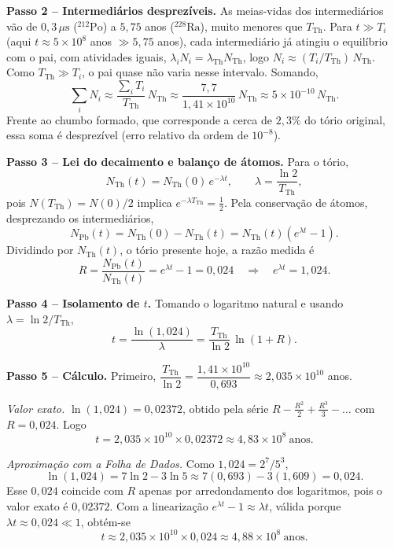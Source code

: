 \documentclass{article}%
\begin{document}
\textbf{Passo 2 -- Intermediários desprezíveis.} As meias-vidas dos intermediários vão de $0{,}3\,\mu\mathrm{s}$ (${}^{212}\mathrm{Po}$) a $5{,}75$ anos (${}^{228}\mathrm{Ra}$), muito menores que $T_{\mathrm{Th}}$. Para $t\gg T_i$ (aqui $t\approx5\times10^{8}$ anos $\gg5{,}75$ anos), cada intermediário já atingiu o equilíbrio com o pai, com atividades iguais, $\lambda_iN_i=\lambda_{\mathrm{Th}}N_{\mathrm{Th}}$, logo $N_i\approx(T_i/T_{\mathrm{Th}})\,N_{\mathrm{Th}}$. Como $T_{\mathrm{Th}}\gg T_i$, o pai quase não varia nesse intervalo. Somando,
\[
\sum_i N_i\approx\frac{\sum_i T_i}{T_{\mathrm{Th}}}\,N_{\mathrm{Th}}\approx\frac{7{,}7}{1{,}41\times10^{10}}\,N_{\mathrm{Th}}\approx5\times10^{-10}\,N_{\mathrm{Th}}.
\]
Frente ao chumbo formado, que corresponde a cerca de $2{,}3\%$ do tório original, essa soma é desprezível (erro relativo da ordem de $10^{-8}$).

\textbf{Passo 3 -- Lei do decaimento e balanço de átomos.} Para o tório,
\[
N_{\mathrm{Th}}(t)=N_{\mathrm{Th}}(0)\,e^{-\lambda t},\qquad \lambda=\frac{\ln 2}{T_{\mathrm{Th}}},
\]
pois $N(T_{\mathrm{Th}})=N(0)/2$ implica $e^{-\lambda T_{\mathrm{Th}}}=\tfrac12$. Pela conservação de átomos, desprezando os intermediários,
\[
N_{\mathrm{Pb}}(t)=N_{\mathrm{Th}}(0)-N_{\mathrm{Th}}(t)=N_{\mathrm{Th}}(t)\left(e^{\lambda t}-1\right).
\]
Dividindo por $N_{\mathrm{Th}}(t)$, o tório presente hoje, a razão medida é
\[
R=\frac{N_{\mathrm{Pb}}(t)}{N_{\mathrm{Th}}(t)}=e^{\lambda t}-1=0{,}024\quad\Longrightarrow\quad e^{\lambda t}=1{,}024.
\]

\textbf{Passo 4 -- Isolamento de $t$.} Tomando o logaritmo natural e usando $\lambda=\ln 2/T_{\mathrm{Th}}$,
\[
t=\frac{\ln(1{,}024)}{\lambda}=\frac{T_{\mathrm{Th}}}{\ln 2}\,\ln(1+R).
\]

\textbf{Passo 5 -- Cálculo.} Primeiro, $\dfrac{T_{\mathrm{Th}}}{\ln 2}=\dfrac{1{,}41\times10^{10}}{0{,}693}\approx2{,}035\times10^{10}$ anos.

\emph{Valor exato.} $\ln(1{,}024)=0{,}02372$, obtido pela série $R-\tfrac{R^2}{2}+\tfrac{R^3}{3}-\dots$ com $R=0{,}024$. Logo
\[
t=2{,}035\times10^{10}\times0{,}02372\approx4{,}83\times10^{8}\ \text{anos}.
\]

\emph{Aproximação com a Folha de Dados.} Como $1{,}024=2^{7}/5^{3}$,
\[
\ln(1{,}024)=7\ln2-3\ln5\approx7(0{,}693)-3(1{,}609)=0{,}024.
\]
Esse $0{,}024$ coincide com $R$ apenas por arredondamento dos logaritmos, pois o valor exato é $0{,}02372$. Com a linearização $e^{\lambda t}-1\approx\lambda t$, válida porque $\lambda t\approx0{,}024\ll1$, obtém-se
\[
t\approx2{,}035\times10^{10}\times0{,}024\approx4{,}88\times10^{8}\ \text{anos}.
\]
\end{document}
